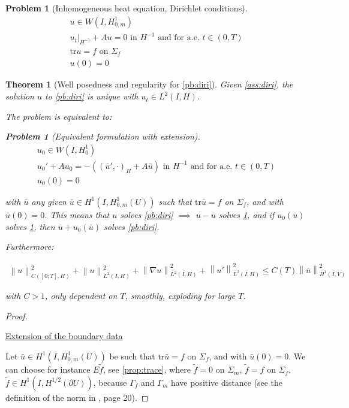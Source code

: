 \documentclass[english,a4paper,9pt,oneside]{scrbook}	%
\theoremstyle{break}
\newtheorem{thm}[equation]{Theorem}
\newtheorem{pb}[equation]{Problem}
\newenvironment{mproof}[1][\proofname]{%
  \begin{proof}[#1]$ $\par\nobreak\ignorespaces
}{%
  \end{proof}
}
\renewcommand*{\proofname}{Proof}
\theoremstyle{remark}
\newcommand{\norm}[1]{\left\lVert#1\right\rVert}
\newcommand{\tr}{\text{tr}}
\begin{document}
\begin{appendices}
\begin{pb}[Inhomogeneous heat equation, Dirichlet conditions]
\begin{align}
u \in W(I,H^1_{0,m}) \\
u_t|_{H^{-1}} + A u = 0 \text{ in }H^{-1} \text{ and for a.e. } t \in (0,T) \\
\tr u = f \text{ on } \Sigma_f\\
u(0)=0
\end{align}

\end{pb}

\begin{thm}[Well posedness and regularity for \cref{pb:diri}]
\label{prop:diri_wp}
Given \cref{ass:diri}, the solution $u$ to \cref{pb:diri} is unique with $u_t \in L^2(I,H)$. 


The problem is equivalent to:

\begin{pb}[Equivalent formulation with extension]
\label{pb:diri_ext}
\begin{align}
u_0 \in W(I,H^1_0) \\
u_0' + A u_0 = -((\bar{u}',\cdot)_H+A \bar{u}) \text{ in }H^{-1} \text{ and for a.e. } t \in (0,T) \\
u_0(0)=0
\end{align}
\end{pb}

with $\bar{u}$ any given $\bar{u}\in H^1(I,H^1_{0,m}(U))$ such that $\tr \bar{u} =f$ on $\Sigma_f$, and with $\bar{u}(0)=0$. This means that $u$ solves \cref{pb:diri} $\implies$ $u-\bar{u}$ solves \cref{pb:diri_ext}, and if $u_0(\bar{u})$ solves  \cref{pb:diri_ext}, then $\bar{u}+u_0(\bar{u})$ solves \cref{pb:diri}.

Furthermore: 

\begin{align}
\norm{u}^2_{C([0;T],H)}+\norm{u}_{L^2(I,H)}^2+ \norm{\nabla u}_{L^2(I,H)}^2 + \norm{u'}^2_{L^2(I,H)}\leq C(T)\norm{\bar{u}}_{H^1(I,V)}^2
\end{align}

with $C>1$, only dependent on $T$, smoothly, exploding for large $T$.

\end{thm}
\begin{mproof}

\underline{Extension of the boundary data}

Let $\bar{u}\in H^1(I,H^1_{0,m}(U))$ be such that $\tr \bar{u} =f$ on $\Sigma_f$, and with $\bar{u}(0)=0$. We can choose for instance $E\tilde{f}$, see \cref{prop:trace}, where $\tilde{f}=0$ on $\Sigma_m$, $\tilde{f}=f$ on $\Sigma_f$. $\tilde{f} \in H^1(I,H^{1/2}(\partial U))$, because $\Gamma_f$ and $\Gamma_m$ have positive distance (see the definition of the norm in \cite{grisvard}, page 20).  


\end{mproof}
\end{appendices}
\end{document}
